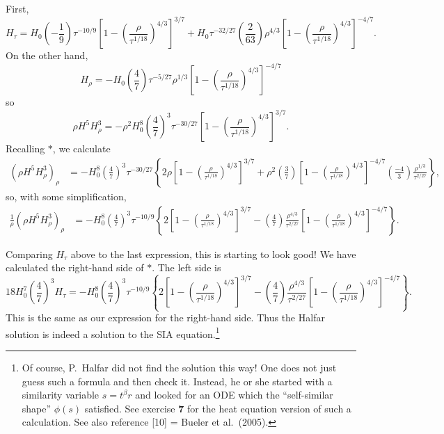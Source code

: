 \documentclass[10pt]{amsart}
\begin{document}
First,
    $$H_\tau = H_0 \left(-\frac{1}{9}\right) \tau^{-10/9} \left[1 - \left( \frac{\rho}{\tau^{1/18}} \right)^{4/3}\right]^{3/7} + H_0 \tau^{-32/27} \left(\frac{2}{63}\right) \rho^{4/3}  \left[1 - \left( \frac{\rho}{\tau^{1/18}} \right)^{4/3}\right]^{-4/7}.$$
On the other hand,
    $$H_\rho = - H_0 \left(\frac{4}{7}\right) \tau^{-5/27} \rho^{1/3} \left[1 - \left( \frac{\rho}{\tau^{1/18}} \right)^{4/3}\right]^{-4/7}$$
so
    $$\rho H^5 H_\rho^3 = -\rho^2 H_0^8 \left(\frac{4}{7}\right)^3 \tau^{-30/27} \left[1 - \left( \frac{\rho}{\tau^{1/18}} \right)^{4/3}\right]^{3/7}.$$
Recalling $\ast$, we calculate
\begin{align*}
\left(\rho H^5 H_\rho^3\right)_\rho &= - H_0^8 \left(\frac{4}{7}\right)^3 \tau^{-30/27} \left\{2 \rho \left[1 - \left( \frac{\rho}{\tau^{1/18}} \right)^{4/3}\right]^{3/7} + \rho^2 \left(\frac{3}{7}\right) \left[1 - \left( \frac{\rho}{\tau^{1/18}} \right)^{4/3}\right]^{-4/7}  \left(\frac{-4}{3}\right) \frac{\rho^{1/3}}{\tau^{2/27}}\right\},
\end{align*}
so, with some simplification,
\begin{align*}
\frac{1}{\rho} \left(\rho H^5 H_\rho^3\right)_\rho &= - H_0^8 \left(\frac{4}{7}\right)^3 \tau^{-10/9} \left\{ 2 \left[1 - \left( \frac{\rho}{\tau^{1/18}} \right)^{4/3}\right]^{3/7} - \left(\frac{4}{7}\right) \frac{\rho^{4/3}}{\tau^{2/27}} \left[1 - \left( \frac{\rho}{\tau^{1/18}} \right)^{4/3}\right]^{-4/7} \right\}.
\end{align*}

Comparing $H_\tau$ above to the last expression, this is starting to look good!  We have calculated the right-hand side of $\ast$.  The left side is
    $$18 H_0^7 \left(\frac{4}{7}\right)^3 H_\tau = - H_0^8 \left(\frac{4}{7}\right)^3 \tau^{-10/9} \left\{ 2 \left[1 - \left( \frac{\rho}{\tau^{1/18}} \right)^{4/3}\right]^{3/7} - \left(\frac{4}{7}\right) \frac{\rho^{4/3}}{\tau^{2/27}} \left[1 - \left( \frac{\rho}{\tau^{1/18}} \right)^{4/3}\right]^{-4/7} \right\}.$$
This is the same as our expression for the right-hand side.  Thus the Halfar solution is indeed a solution to the SIA equation.\footnote{Of course, P.~Halfar did not find the solution this way!  One does not just guess such a formula and then check it.  Instead, he or she started with a similarity variable $s = t^\beta r$ and looked for an ODE which the ``self-similar shape'' $\phi(s)$ satisfied.  See exercise \textbf{7} for the heat equation version of such a calculation.  See also reference [10] = Bueler et al.~(2005).}
\end{document}

